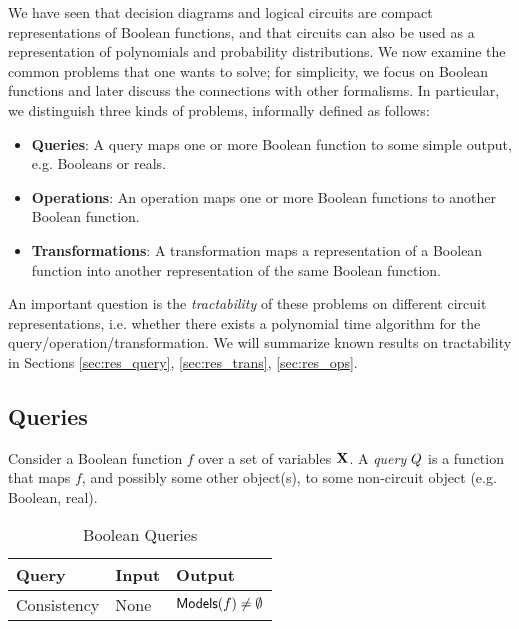 
We have seen that decision diagrams and logical circuits are compact representations of Boolean functions, and that circuits can also be used as a representation of polynomials and probability distributions. We now examine the common problems that one wants to solve; for simplicity, we focus on Boolean functions and later discuss the connections with other formalisms. In particular, we distinguish three kinds of problems, informally defined as follows:
\begin{itemize}
  \item \textbf{Queries}: A query maps one or more Boolean function to some simple output, e.g. Booleans or reals.
  \item \textbf{Operations}: An operation maps one or more Boolean functions to another Boolean function.
  \item \textbf{Transformations}: A transformation maps a representation of a Boolean function into another representation of the same Boolean function.
\end{itemize}
An important question is the \emph{tractability} of these problems on different circuit representations, i.e. whether there exists a polynomial time algorithm for the query/operation/transformation. We will summarize known results on tractability in Sections \ref{sec:res_query}, \ref{sec:res_trans}, \ref{sec:res_ops}. 

\subsection{Queries}
Consider a Boolean function $f$ over a set of variables $\mathbf{X}$. A \emph{query} $Q$ is a function that maps $f$, and possibly some other object(s), to some non-circuit object (e.g. Boolean, real). 

\begin{table}[]
\centering
\begin{tabular}{@{}lll@{}}
\toprule
\textbf{Query} & \textbf{Input}         & \textbf{Output} \\ \midrule
Consistency & None & $\mathsf{Models}(f) \neq \emptyset$  \\ \bottomrule
\end{tabular}
\label{tbl:bool_ queries}
\caption{Boolean Queries}
\end{table}


